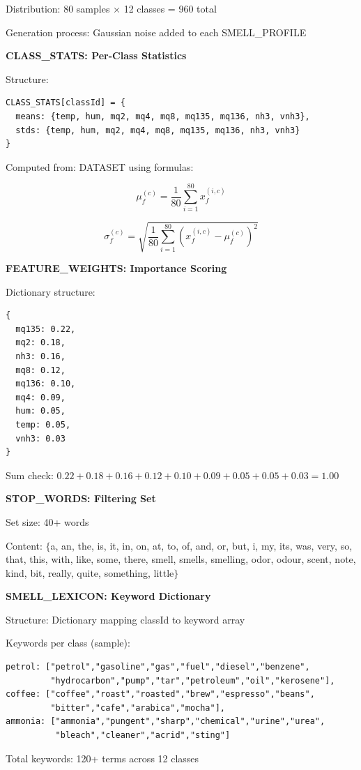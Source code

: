 \documentclass[12pt,a4paper]{article}
\begin{document}
Distribution: 80 samples × 12 classes = 960 total

Generation process: Gaussian noise added to each SMELL\_PROFILE

\textbf{CLASS\_STATS: Per-Class Statistics}

Structure:
\begin{verbatim}
CLASS_STATS[classId] = {
  means: {temp, hum, mq2, mq4, mq8, mq135, mq136, nh3, vnh3},
  stds: {temp, hum, mq2, mq4, mq8, mq135, mq136, nh3, vnh3}
}
\end{verbatim}

Computed from: DATASET using formulas:

$$\mu_f^{(c)} = \frac{1}{80} \sum_{i=1}^{80} x_f^{(i,c)}$$

$$\sigma_f^{(c)} = \sqrt{\frac{1}{80} \sum_{i=1}^{80} (x_f^{(i,c)} - \mu_f^{(c)})^2}$$

\textbf{FEATURE\_WEIGHTS: Importance Scoring}

Dictionary structure:
\begin{verbatim}
{
  mq135: 0.22,
  mq2: 0.18,
  nh3: 0.16,
  mq8: 0.12,
  mq136: 0.10,
  mq4: 0.09,
  hum: 0.05,
  temp: 0.05,
  vnh3: 0.03
}
\end{verbatim}

Sum check: $0.22 + 0.18 + 0.16 + 0.12 + 0.10 + 0.09 + 0.05 + 0.05 + 0.03 = 1.00$ \checkmark

\textbf{STOP\_WORDS: Filtering Set}

Set size: 40+ words

Content: $\{$a, an, the, is, it, in, on, at, to, of, and, or, but, i, my, its, was, very, so, that, this, with, like, some, there, smell, smells, smelling, odor, odour, scent, note, kind, bit, really, quite, something, little$\}$

\textbf{SMELL\_LEXICON: Keyword Dictionary}

Structure: Dictionary mapping classId to keyword array

Keywords per class (sample):
\begin{verbatim}
petrol: ["petrol","gasoline","gas","fuel","diesel","benzene",
         "hydrocarbon","pump","tar","petroleum","oil","kerosene"],
coffee: ["coffee","roast","roasted","brew","espresso","beans",
         "bitter","cafe","arabica","mocha"],
ammonia: ["ammonia","pungent","sharp","chemical","urine","urea",
          "bleach","cleaner","acrid","sting"]
\end{verbatim}

Total keywords: 120+ terms across 12 classes
\end{document}
